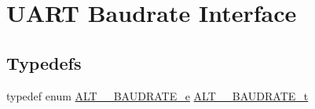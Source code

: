\hypertarget{group__UART__BAUD}{}\section{U\+A\+RT Baudrate Interface}
\label{group__UART__BAUD}
\subsection*{Typedefs}
\begin{DoxyCompactItemize}
\item 
typedef enum \mbox{\hyperlink{group__UART__BAUD_ga037b0f91fcaa13dd341ad8fc6f9cd45f}{A\+L\+T\+\_\+\_\+\+B\+A\+U\+D\+R\+A\+T\+E\+\_\+e}} \mbox{\hyperlink{group__UART__BAUD_gaed35f30e7439e47bfaa11ee024f47790}{A\+L\+T\+\_\+\_\+\+B\+A\+U\+D\+R\+A\+T\+E\+\_\+t}}
\end{DoxyCompactItemize}
